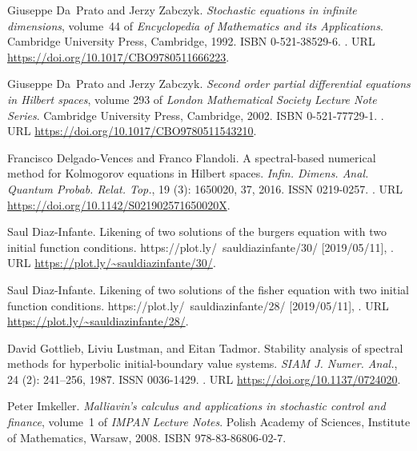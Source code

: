 \documentclass[]{interact}
\theoremstyle{plain}%
\theoremstyle{definition}
\theoremstyle{remark}
\begin{document}
\begin{thebibliography}{20}
Giuseppe Da~Prato and Jerzy Zabczyk.
\newblock \emph{Stochastic equations in infinite dimensions}, volume~44 of
  \emph{Encyclopedia of Mathematics and its Applications}.
\newblock Cambridge University Press, Cambridge, 1992.
\newblock ISBN 0-521-38529-6.
\newblock {}.
\newblock URL \url{https://doi.org/10.1017/CBO9780511666223}.

Giuseppe Da~Prato and Jerzy Zabczyk.
\newblock \emph{Second order partial differential equations in {H}ilbert
  spaces}, volume 293 of \emph{London Mathematical Society Lecture Note
  Series}.
\newblock Cambridge University Press, Cambridge, 2002.
\newblock ISBN 0-521-77729-1.
\newblock {}.
\newblock URL \url{https://doi.org/10.1017/CBO9780511543210}.

Francisco Delgado-Vences and Franco Flandoli.
\newblock A spectral-based numerical method for {K}olmogorov equations in
  {H}ilbert spaces.
\newblock \emph{Infin. Dimens. Anal. Quantum Probab. Relat. Top.}, 19
  (3): 1650020, 37, 2016.
\newblock ISSN 0219-0257.
\newblock {}.
\newblock URL \url{https://doi.org/10.1142/S021902571650020X}.

Saul Diaz-Infante.
\newblock Likening of two solutions of the burgers equation with two initial
  function conditions.
\newblock https://plot.ly/~sauldiazinfante/30/ [2019/05/11], {}.
\newblock URL \url{https://plot.ly/~sauldiazinfante/30/}.

Saul Diaz-Infante.
\newblock Likening of two solutions of the fisher equation with two initial
  function conditions.
\newblock https://plot.ly/~sauldiazinfante/28/ [2019/05/11], {}.
\newblock URL \url{https://plot.ly/~sauldiazinfante/28/}.

David Gottlieb, Liviu Lustman, and Eitan Tadmor.
\newblock Stability analysis of spectral methods for hyperbolic
  initial-boundary value systems.
\newblock \emph{SIAM J. Numer. Anal.}, 24 (2): 241--256,
  1987.
\newblock ISSN 0036-1429.
\newblock {}.
\newblock URL \url{https://doi.org/10.1137/0724020}.

Peter Imkeller.
\newblock \emph{Malliavin's calculus and applications in stochastic control and
  finance}, volume~1 of \emph{IMPAN Lecture Notes}.
\newblock Polish Academy of Sciences, Institute of Mathematics, Warsaw, 2008.
\newblock ISBN 978-83-86806-02-7.


\end{thebibliography}
\end{document}
